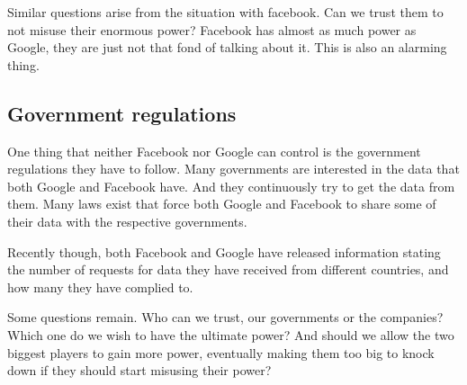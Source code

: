 Similar questions arise from the situation with facebook. Can we trust them to not misuse their enormous power? Facebook has almost as much power as Google, they are just not that fond of talking about it. This is also an alarming thing.

\subsection{Government regulations}
One thing that neither Facebook nor Google can control is the government regulations they have to follow. Many governments are interested in the data that both Google and Facebook have. And they continuously try to get the data from them. Many laws exist that force both Google and Facebook to share some of their data with the respective governments.

Recently though, both Facebook and Google have released information stating the number of requests for data they have received from different countries, and how many they have complied to.\cite{website:facebook-requests}\cite{website:google-requests}

Some questions remain. Who can we trust, our governments or the companies? Which one do we wish to have the ultimate power? And should we allow the two biggest players to gain more power, eventually making them too big to knock down if they should start misusing their power?
